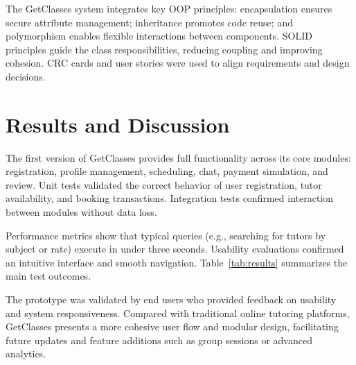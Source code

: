 \documentclass[conference]{IEEEtran}
\begin{document}
The GetClasses system integrates key OOP principles: encapsulation ensures secure attribute management; inheritance promotes code reuse; and polymorphism enables flexible interactions between components. SOLID principles guide the class responsibilities, reducing coupling and improving cohesion. CRC cards and user stories were used to align requirements and design decisions.

\section{Results and Discussion}
The first version of GetClasses provides full functionality across its core modules: registration, profile management, scheduling, chat, payment simulation, and review. Unit tests validated the correct behavior of user registration, tutor availability, and booking transactions. Integration tests confirmed interaction between modules without data loss.

Performance metrics show that typical queries (e.g., searching for tutors by subject or rate) execute in under three seconds. Usability evaluations confirmed an intuitive interface and smooth navigation. Table~\ref{tab:results} summarizes the main test outcomes.

\begin{table}[H]
\centering
\caption{Summary of functional testing results}
\label{tab:results}
\end{table}


The prototype was validated by end users who provided feedback on usability and system responsiveness. Compared with traditional online tutoring platforms, GetClasses presents a more cohesive user flow and modular design, facilitating future updates and feature additions such as group sessions or advanced analytics.
\end{document}
